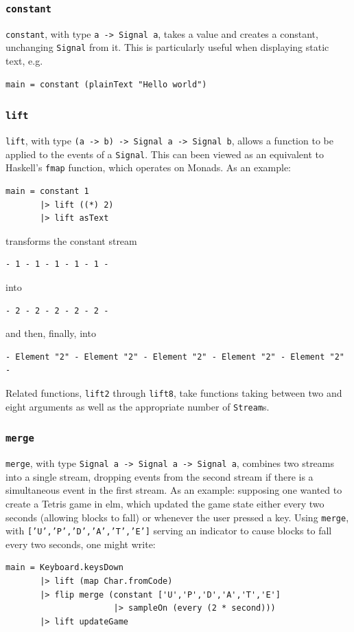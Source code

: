 \documentclass[12pt]{article}
\begin{document}
\subsubsection{\texttt{constant}}
\texttt{constant}, with type \texttt{a -> Signal a}, takes a value and creates a constant, unchanging \texttt{Signal} from it. This is particularly useful when displaying static text, e.g.
\begin{verbatim}
main = constant (plainText "Hello world")
\end{verbatim}
\subsubsection{\texttt{lift}}
\texttt{lift}, with type \texttt{(a -> b) -> Signal a -> Signal b}, allows a function to be applied to the events of a \texttt{Signal}. This can been viewed as an equivalent to Haskell's \texttt{fmap} function, which operates on Monads. As an example:
\begin{verbatim}
main = constant 1
       |> lift ((*) 2)
       |> lift asText
\end{verbatim}
transforms the constant stream
\begin{verbatim}
- 1 - 1 - 1 - 1 - 1 -
\end{verbatim}
into
\begin{verbatim}
- 2 - 2 - 2 - 2 - 2 -
\end{verbatim}
and then, finally, into
\begin{verbatim}
- Element "2" - Element "2" - Element "2" - Element "2" - Element "2" -
\end{verbatim}
Related functions, \texttt{lift2} through \texttt{lift8}, take functions taking between two and eight arguments as well as the appropriate number of \texttt{Stream}s.
\subsubsection{\texttt{merge}}
\texttt{merge}, with type \texttt{Signal a -> Signal a -> Signal a}, combines two streams into a single stream, dropping events from the second stream if there is a simultaneous event in the first stream. As an example: supposing one wanted to create a Tetris game in elm, which updated the game state either every two seconds (allowing blocks to fall) or whenever the user pressed a key. Using \texttt{merge}, with \texttt{['U','P','D','A','T','E']} serving an indicator to cause blocks to fall every two seconds, one might write:
\begin{samepage}
\begin{verbatim}
main = Keyboard.keysDown
       |> lift (map Char.fromCode)
       |> flip merge (constant ['U','P','D','A','T','E']
                      |> sampleOn (every (2 * second)))
       |> lift updateGame
\end{verbatim}
\end{samepage}
\end{document}
